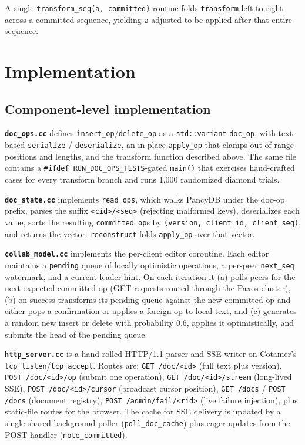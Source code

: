 \documentclass[11pt]{article}
\newcommand{\code}[1]{\texttt{#1}}
\begin{document}
A single \code{transform\_seq(a, committed)} routine folds \code{transform} left-to-right across a committed sequence, yielding \code{a} adjusted to be applied after that entire sequence.

\section{Implementation}

\subsection{Component-level implementation}

\textbf{\code{doc\_ops.cc}} defines \code{insert\_op}/\code{delete\_op} as a \code{std::variant} \code{doc\_op}, with text-based \code{serialize} / \code{deserialize}, an in-place \code{apply\_op} that clamps out-of-range positions and lengths, and the transform function described above. The same file contains a \code{\#ifdef RUN\_DOC\_OPS\_TESTS}-gated \code{main()} that exercises hand-crafted cases for every transform branch and runs 1{,}000 randomized diamond trials.

\textbf{\code{doc\_state.cc}} implements \code{read\_ops}, which walks PancyDB under the doc-op prefix, parses the suffix \code{<cid>/<seq>} (rejecting malformed keys), deserializes each value, sorts the resulting \code{committed\_op}s by \code{(version, client\_id, client\_seq)}, and returns the vector. \code{reconstruct} folds \code{apply\_op} over that vector.

\textbf{\code{collab\_model.cc}} implements the per-client editor coroutine. Each editor maintains a \code{pending} queue of locally optimistic operations, a per-peer \code{next\_seq} watermark, and a current leader hint. On each iteration it (a) polls peers for the next expected committed op (GET requests routed through the Paxos cluster), (b) on success transforms its pending queue against the new committed op and either pops a confirmation or applies a foreign op to local text, and (c) generates a random new insert or delete with probability 0.6, applies it optimistically, and submits the head of the pending queue.

\textbf{\code{http\_server.cc}} is a hand-rolled HTTP/1.1 parser and SSE writer on Cotamer's \code{tcp\_listen}/\code{tcp\_accept}. Routes are: \code{GET /doc/<id>} (full text plus version), \code{POST /doc/<id>/op} (submit one operation), \code{GET /doc/<id>/stream} (long-lived SSE), \code{POST /doc/<id>/cursor} (broadcast cursor position), \code{GET /docs} / \code{POST /docs} (document registry), \code{POST /admin/fail/<rid>} (live failure injection), plus static-file routes for the browser. The cache for SSE delivery is updated by a single shared background poller (\code{poll\_doc\_cache}) plus eager updates from the POST handler (\code{note\_committed}).
\end{document}
